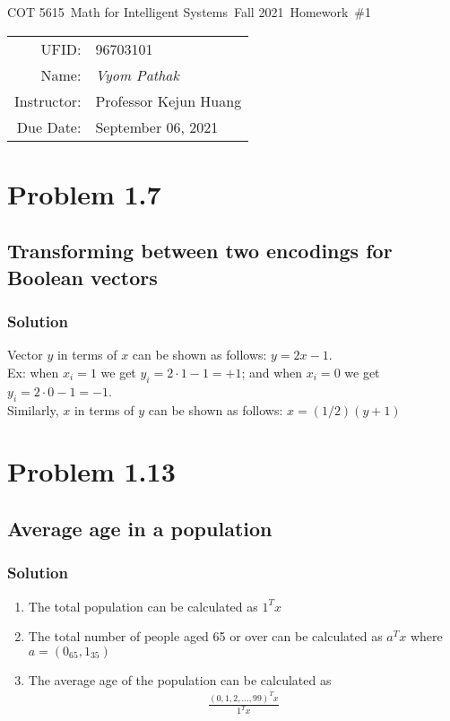 \documentclass{article}
\newcommand{\hmwkTitle}{Homework\ \#1}
\newcommand{\hmwkDueDate}{September 06, 2021}
\newcommand{\hmwkClassCode}{COT 5615}
\newcommand{\hmwkClass}{Math for Intelligent Systems}
\newcommand{\hmwkClassYear}{Fall 2021}
\newcommand{\hmwkClassInstructor}{Professor Kejun Huang}
\newcommand{\hmwkAuthorName}{\textit{Vyom Pathak}}
\newcommand{\hmwkUFID}{96703101}
\begin{document}
\begin{center}
{\Large \hmwkClassCode\ \hmwkClass\ \hmwkClassYear\ \hmwkTitle}

\begin{tabular}{rl}
UFID: & \hmwkUFID \\
Name: & \hmwkAuthorName \\
Instructor: & \hmwkClassInstructor \\
Due Date: & \hmwkDueDate \\ 
\end{tabular}
\end{center}

\section*{Problem 1.7}
\subsection*{Transforming between two encodings for Boolean vectors}
\subsubsection*{Solution}
Vector $y$ in terms of $x$ can be shown as follows: $y = 2x - 1$. \\ Ex: 
when $x_i = 1$ we get $y_i = 2 \cdot 1-1 = + 1$; and when $x_i = 0$ we get $y_i = 2 \cdot 0-1 = -1$.\\
Similarly, $x$ in terms of $y$ can be shown as follows: $x = (1/2)(y + 1)$

\section*{Problem 1.13}
\subsection*{Average age in a population}
\subsubsection*{Solution}
\begin{enumerate}[label=(\alph*)]
  \item The total population can be calculated as $1^Tx$
  \item The total number of people aged 65 or over can be calculated as $a^Tx$ where $a = (0_{65},1_{35})$ 
  \item The average age of the population can be calculated as
  \begin{align*}
        \frac{(0, 1, 2, ... , 99)^Tx}{1^Tx}
\end{align*}
\end{enumerate}
\end{document}
